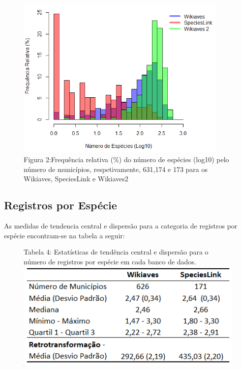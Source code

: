 \documentclass[12pt]{extarticle}
\newenvironment{resposta}{ \color{mygray}}{}
\begin{document}
\begin{figure}[h!]
\centering
\includegraphics[height = 8cm]{Imagens/H02.png}
\\{\scriptsize Figura 2:Frequência relativa (\%) do número de espécies (log10) pelo número de municípios, respetivamente, 631,174 e 173 para os Wikiaves, SpeciesLink e Wikiaves2  }
\end{figure}


\subsection{Registros por Espécie}

\begin{resposta}
As medidas de tendencia central e dispersão para a categoria de registros por espécie encontram-se na tabela a seguir: 
\end{resposta}

\newpage

\begin{figure}[h!]
\centering
{\scriptsize Tabela 4: Estatísticas de tendência central e dispersão para o número de registros por espécie em cada banco de dados.}
\includegraphics{Imagens/T04.png}
\end{figure}
\end{document}
